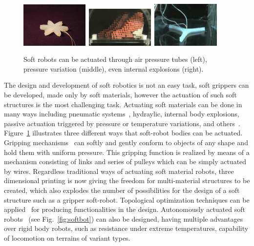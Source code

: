 \begin{figure}[t!]
\centering
\includegraphics[width=0.3\textwidth,height=0.13\textheight]{../Figures/Misc/soft_robotics_figure.png}\		
\includegraphics[width=0.3\textwidth,height=0.13\textheight]{../Figures/Misc/hillerPressureChamber.png}\	
\includegraphics[width=0.3\textwidth,height=0.13\textheight]{../Figures/Misc/ExplodingRobot.jpg}\\
\caption{Soft robots can be actuated through air pressure tubes (left), pressure variation (middle), even internal explosions (right).}
\label{fig:softRobotsActuation}
\end{figure}

The design and development of soft robotics is not an easy task, soft grippers can be developed, made only by soft materials, however the actuation of such soft structures is the most challenging task. Actuating soft materials can be done in many ways including pneumatic systems~\citep{ilievski2011soft, shepherd2011multigait}, hydraylic, internal body explosions, passive actuation triggered by pressure or temperature variations, and others~\citep{laschi2012soft, seok2010peristaltic}. Figure~\ref{fig:softRobotsActuation} illustrates three different ways that soft-robot bodies can be actuated. Gripping mechanisms~\citep{hirose1978development} can softly and gently conform to objects of any shape and hold them with uniform pressure. This gripping function is realized by means of a mechanism consisting of links and series of pulleys which can be simply actuated by wires. Regardless traditional ways of actuating soft material robots, three dimensional printing is now giving the freedom for multi-material structures to be created, which also explodes the number of possibilities for the design of a soft structure such as a gripper soft-robot. Topological optimization techniques can be applied~\citep{hiller2009multi} for producing functionalities in the design. Autonomously actuated soft robots~\citep{tolleyresilient} (see Fig.~\ref{fig:softbot}) can also be designed, having multiple advantages over rigid body robots, such as resistance under extreme temperatures, capability of locomotion on terrains of variant types. 

